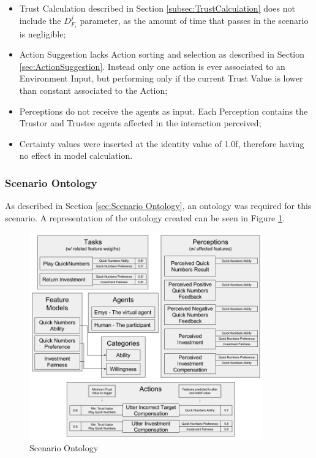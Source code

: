 \begin{itemize}
    \item Trust Calculation described in Section \ref{subsec:TrustCalculation} does not include the $D^j_{F_i}$ parameter, as the amount of time that passes in the scenario is negligible;
    \item Action Suggestion lacks Action sorting and selection as described in Section \ref{sec:ActionSuggestion}. Instead only one action is ever associated to an Environment Input, but performing only if the current Trust Value is lower than constant associated to the Action;
    \item Perceptions do not receive the agents as input. Each Perception contains the Trustor and Trustee agents affected in the interaction perceived;
    \item Certainty values were inserted at the identity value of 1.0f, therefore having no effect in model calculation.
\end{itemize} 

\subsubsection{Scenario Ontology}
As described in Section \ref{sec:Scenario Ontology}, an ontology was required for this scenario. A representation of the ontology created can be seen in Figure \ref{fig:ScenarioOntology}.

\begin{figure}[hbt]
    \centering
    \includegraphics[width=0.9\textwidth]{figures/ScenarioOntology.png}
    \caption{Scenario Ontology}
    \label{fig:ScenarioOntology}
\end{figure}

